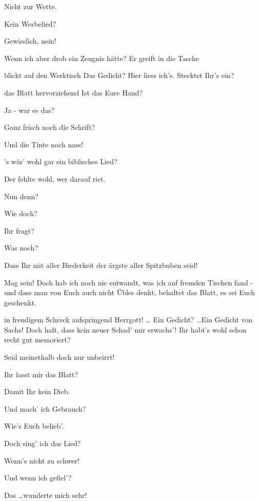 \begin{drama}
\Sachsspeaks
Nicht zur Wette.

\Beckmesserspeaks
Kein Werbelied?

\Sachsspeaks
Gewisslich, nein!

\Beckmesserspeaks
Wenn ich aber drob ein Zeugnis hätte?
Er greift in die Tasche

\Sachsspeaks
blickt auf den Werktisch
Das Gedicht? Hier liess ich's. Stecktet Ihr's ein?

\Beckmesserspeaks
das Blatt hervorziehend
Ist das Eure Hand?

\Sachsspeaks
Ja - war es das?

\Beckmesserspeaks
Ganz frisch noch die Schrift?

\Sachsspeaks
Und die Tinte noch nass!

\Beckmesserspeaks
's wär' wohl gar ein biblisches Lied?

\Sachsspeaks
Der fehlte wohl, wer darauf riet.

\Beckmesserspeaks
Nun denn?

\Sachsspeaks
Wie doch?

\Beckmesserspeaks
Ihr fragt?

\Sachsspeaks
Was noch?

\Beckmesserspeaks
Dass Ihr mit aller Biederkeit
der ärgste aller Spitzbuben seid!

\Sachsspeaks
Mag sein! Doch hab ich noch nie entwandt,
was ich auf fremden Tischen fand -
und dass man von Euch auch nicht Übles denkt,
behaltet das Blatt, es sei Euch geschenkt.

\Beckmesserspeaks
in freudigem Schreck aufspringend
Herrgott! \ldots 
Ein Gedicht? \ldots  Ein Gedicht von Sachs!
Doch halt, dass kein neuer Schad' mir erwachs'!
Ihr habt's wohl schon recht gut memoriert?

\Sachsspeaks
Seid meinethalb doch nur unbeirrt!

\Beckmesserspeaks
Ihr lasst mir das Blatt?

\Sachsspeaks
Damit Ihr kein Dieb.

\Beckmesserspeaks
Und mach' ich Gebrauch?

\Sachsspeaks
Wie's Euch belieb'.

\Beckmesserspeaks
Doch sing' ich das Lied?

\Sachsspeaks
Wenn's nicht zu schwer!

\Beckmesserspeaks
Und wenn ich gefiel'?

\Sachsspeaks
Das \ldots  wunderte mich sehr!


\end{drama}
